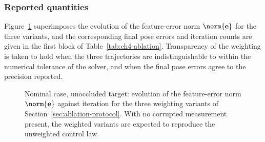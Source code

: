 \subsubsection*{Reported quantities}

Figure~\ref{fig:nominal-error} superimposes the evolution of the feature-error
norm $\norm{\mathbf{e}}$ for the three variants, and the corresponding final
pose errors and iteration counts are given in the first block of
Table~\ref{tab:ch4-ablation}. Transparency of the weighting is taken to hold
when the three trajectories are indistinguishable to within the numerical
tolerance of the solver, and when the final pose errors agree to the precision
reported.


\begin{figure}[t]
    \centering
    \caption{Nominal case, unoccluded target: evolution of the feature-error
    norm $\norm{\mathbf{e}}$ against iteration for the three weighting variants
    of Section~\ref{sec:ablation-protocol}. With no corrupted measurement
    present, the weighted variants are expected to reproduce the unweighted
    control law.}
    \label{fig:nominal-error}
\end{figure}
